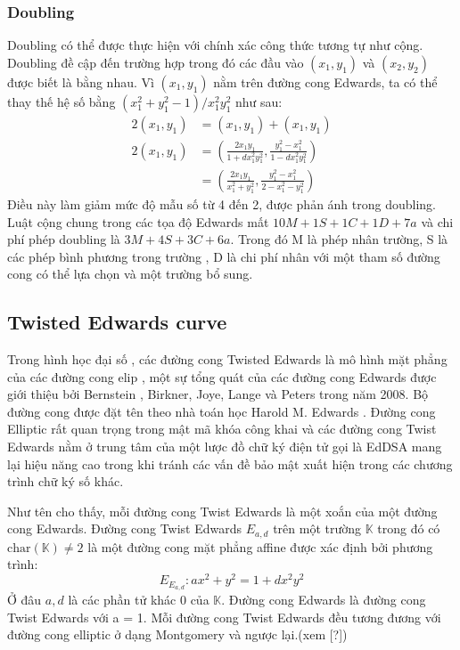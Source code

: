 \documentclass[a4paper,12pt]{report}
\begin{document}
\subsubsection{Doubling}
Doubling có thể được thực hiện với chính xác công thức tương tự như cộng. Doubling đề cập đến trường hợp trong đó các đầu vào $(x_1, y_1)$ và $(x_2, y_2)$ được biết là bằng nhau. Vì $(x_1, y_1)$ nằm trên đường cong Edwards, ta có thể thay thế hệ số bằng $(x_1^2 + y_1^2  - 1)/x_1^2y_1^2$ như sau:
\begin{displaymath}
{\begin{aligned}2(x_{1},y_{1})&=(x_{1},y_{1})+(x_{1},y_{1})\\[6pt]2(x_{1},y_{1})&=\left({\frac  {2x_{1}y_{1}}{1+dx_{1}^{2}y_{1}^{2}}},{\frac  {y_{1}^{2}-x_{1}^{2}}{1-dx_{1}^{2}y_{1}^{2}}}\right)\\[6pt]&=\left({\frac  {2x_{1}y_{1}}{x_{1}^{2}+y_{1}^{2}}},{\frac  {y_{1}^{2}-x_{1}^{2}}{2-x_{1}^{2}-y_{1}^{2}}}\right)\end{aligned}}
\end{displaymath}
Điều này làm giảm mức độ mẫu số từ 4 đến 2, được phản ánh trong doubling. Luật cộng chung trong các tọa độ Edwards mất $10M + 1S + 1C + 1D + 7a$ và chi phí phép doubling là $3M + 4S + 3C + 6a$. Trong đó M là phép nhân trường, S là các phép bình phương trong trường , D là chi phí nhân với một tham số đường cong có thể lựa chọn và một trường bổ sung.
\subsection*{Twisted Edwards curve}
Trong hình học đại số , các đường cong Twisted Edwards là mô hình mặt phẳng của các đường cong elip , một sự tổng quát của các đường cong Edwards được giới thiệu bởi Bernstein , Birkner, Joye, Lange và Peters trong năm 2008. Bộ đường cong được đặt tên theo nhà toán học Harold M. Edwards . Đường cong Elliptic rất quan trọng trong mật mã khóa công khai và các đường cong Twist Edwards nằm ở trung tâm của một lược đồ chữ ký điện tử  gọi là EdDSA mang lại hiệu năng cao trong khi tránh các vấn đề bảo mật xuất hiện trong các chương trình chữ ký số khác.

Như tên cho thấy, mỗi đường cong Twist Edwards là một xoắn của một đường cong Edwards. Đường cong Twist Edwards $E_{a, d}$ trên một trường $\displaystyle \mathbb{K}$ trong đó có $\displaystyle \mathrm{char}(\mathbb{K}) \neq 2$ là một đường cong mặt phẳng affine được xác định bởi phương trình:
\begin{displaymath}
E_{E_{a,d}}: ax^2 + y^2 = 1 + dx^2y^2
\end{displaymath}
Ở đâu $a, d$ là các phần tử khác 0 của $\displaystyle \mathbb{K}$. Đường cong Edwards là đường cong Twist Edwards với a = 1.
Mỗi đường cong Twist Edwards đều tương đương với đường cong elliptic ở dạng Montgomery và ngược lại.(xem [?])
\end{document}
